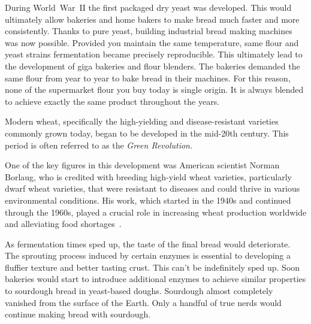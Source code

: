During World~War~II
the first packaged dry yeast was developed. This would ultimately
allow bakeries and home bakers to make bread much faster and
more consistently. Thanks to pure yeast, building industrial bread
making machines was now possible. Provided you maintain the
same temperature, same flour and yeast strains fermentation
became precisely reproducible. This ultimately lead to the development
of giga bakeries and flour blenders. The bakeries demanded
the same flour from year to year to bake bread in their machines.
For this reason, none of the supermarket flour you buy today is single origin.
It is always blended to achieve exactly the same product throughout
the years.

Modern wheat, specifically the high-yielding and disease-resistant
varieties commonly grown today, began to be developed in
the mid-20th century. This period is often referred to as the
\emph{Green Revolution.}

One of the key figures in this development was American
scientist Norman Borlaug, who is credited with breeding
high-yield wheat varieties, particularly dwarf wheat varieties,
that were resistant to diseases and could thrive in various
environmental conditions. His work, which started in the
1940s and continued through the \num{1960}s, played a crucial role in
increasing wheat production worldwide and alleviating food
shortages~\cite{green+revolution}.

As fermentation
times sped up, the taste of the final bread would deteriorate.
The sprouting process induced by certain enzymes is essential
to developing a fluffier texture and better tasting crust. This
can't be indefinitely sped up. Soon bakeries would start
to introduce additional enzymes to achieve similar properties
to sourdough bread in yeast-based doughs. Sourdough almost completely
vanished from the surface of the Earth. Only a handful
of true nerds would continue making bread with sourdough.

